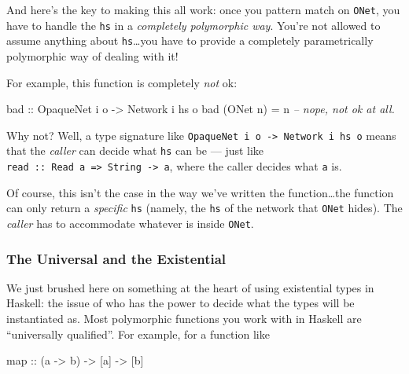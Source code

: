\documentclass[]{article}
\newenvironment{Shaded}{}{}
\newcommand{\DataTypeTok}[1]{\textcolor[rgb]{0.56,0.13,0.00}{{#1}}}
\newcommand{\CommentTok}[1]{\textcolor[rgb]{0.38,0.63,0.69}{\textit{{#1}}}}
\newcommand{\OtherTok}[1]{\textcolor[rgb]{0.00,0.44,0.13}{{#1}}}
\newcommand{\FunctionTok}[1]{\textcolor[rgb]{0.02,0.16,0.49}{{#1}}}
\newcommand{\NormalTok}[1]{{#1}}
\begin{document}
And here's the key to making this all work: once you pattern match on
\texttt{ONet}, you have to handle the \texttt{hs} in a \emph{completely
polymorphic way}. You're not allowed to assume anything about
\texttt{hs}\ldots{}you have to provide a completely parametrically polymorphic
way of dealing with it!

For example, this function is completely \emph{not} ok:

\begin{Shaded}
\begin{Highlighting}[]
\OtherTok{bad ::} \DataTypeTok{OpaqueNet} \NormalTok{i o }\OtherTok{->} \DataTypeTok{Network} \NormalTok{i hs o}
\NormalTok{bad (}\DataTypeTok{ONet} \NormalTok{n) }\FunctionTok{=} \NormalTok{n            }\CommentTok{-- nope, not ok at all.}
\end{Highlighting}
\end{Shaded}

Why not? Well, a type signature like
\texttt{OpaqueNet\ i\ o\ -\textgreater{}\ Network\ i\ hs\ o} means that the
\emph{caller} can decide what \texttt{hs} can be --- just like
\texttt{read\ ::\ Read\ a\ =\textgreater{}\ String\ -\textgreater{}\ a}, where
the caller decides what \texttt{a} is.

Of course, this isn't the case in the way we've written the function\ldots{}the
function can only return a \emph{specific} \texttt{hs} (namely, the \texttt{hs}
of the network that \texttt{ONet} hides). The \emph{caller} has to accommodate
whatever is inside \texttt{ONet}.

\subsubsection{The Universal and the
Existential}\label{the-universal-and-the-existential}

We just brushed here on something at the heart of using existential types in
Haskell: the issue of who has the power to decide what the types will be
instantiated as. Most polymorphic functions you work with in Haskell are
``universally qualified''. For example, for a function like

\begin{Shaded}
\begin{Highlighting}[]
\NormalTok{map}\OtherTok{ ::} \NormalTok{(a }\OtherTok{->} \NormalTok{b) }\OtherTok{->} \NormalTok{[a] }\OtherTok{->} \NormalTok{[b]}
\end{Highlighting}
\end{Shaded}
\end{document}
